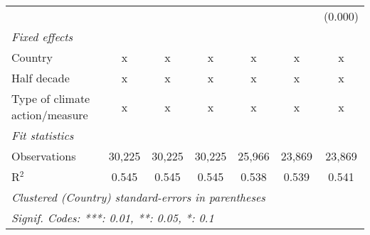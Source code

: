 \begin{tabular}{lcccccc}
                                                                &         &         &             &              &              & (0.000)\\   
   \emph{Fixed effects}\\
   Country                                                      & x       & x       & x           & x            & x            & x\\  
   Half decade                                                  & x       & x       & x           & x            & x            & x\\  
   Type of climate action/measure                               & x       & x       & x           & x            & x            & x\\  
   \midrule \emph{Fit statistics}\\
   Observations                                                 & 30,225  & 30,225  & 30,225      & 25,966       & 23,869       & 23,869\\  
   R$^2$                                                        & 0.545   & 0.545   & 0.545       & 0.538        & 0.539        & 0.541\\  
   \midrule
   \multicolumn{7}{l}{\emph{Clustered (Country) standard-errors in parentheses}}\\
   \multicolumn{7}{l}{\emph{Signif. Codes: ***: 0.01, **: 0.05, *: 0.1}}\\
\end{tabular}
\par\endgroup


